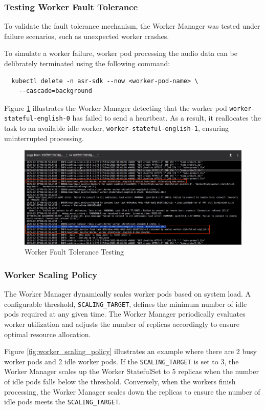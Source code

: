 \subsubsection{Testing Worker Fault Tolerance}
To validate the fault tolerance mechanism, the Worker Manager was tested under failure scenarios, such as unexpected worker crashes.

To simulate a worker failure, worker pod processing the audio data can be delibrately terminated using the following command:
\begin{verbatim}
  kubectl delete -n asr-sdk --now <worker-pod-name> \
    --cascade=background
\end{verbatim}

Figure \ref{fig:worker_fault_tolerance} illustrates the Worker Manager detecting that the worker pod \texttt{worker-\allowbreak stateful-english-0} has failed to send a heartbeat. As a result, it reallocates the task to an available idle worker, \texttt{worker-stateful-english-1}, ensuring uninterrupted processing.

\begin{figure}[H]
  \centering
  \includegraphics[width=\textwidth]{figures/worker_fault_tolerance.png}
  \caption{Worker Fault Tolerance Testing}
  \label{fig:worker_fault_tolerance}
\end{figure}

\subsubsection{Worker Scaling Policy}
The Worker Manager dynamically scales worker pods based on system load. A configurable threshold, \texttt{SCALING\_TARGET}, defines the minimum number of idle pods required at any given time. The Worker Manager periodically evaluates worker utilization and adjusts the number of replicas accordingly to ensure optimal resource allocation.

Figure \ref{fig:worker_scaling_policy} illustrates an example where there are 2 busy worker pods and 2 idle worker pods. If the \texttt{SCALING\_TARGET} is set to 3, the Worker Manager scales up the Worker StatefulSet to 5 replicas when the number of idle pods falls below the threshold. Conversely, when the workers finish processing, the Worker Manager scales down the replicas to ensure the number of idle pods meets the \texttt{SCALING\_TARGET}.

